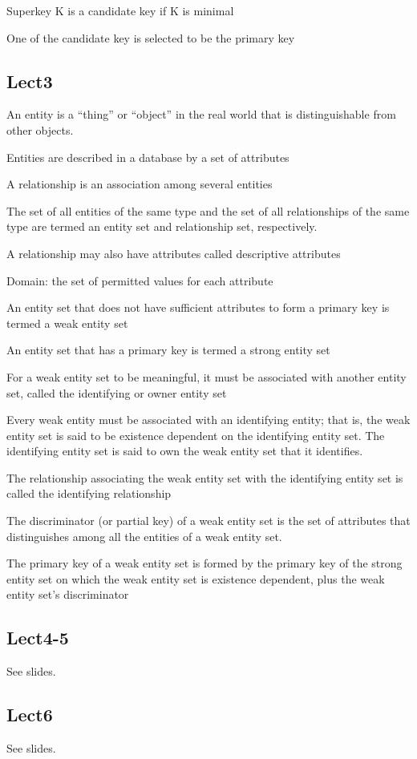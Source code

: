 \documentclass[8pt, a4paper, oneside, twocolumn]{extarticle}
\begin{document}
Superkey K is a candidate key if K is minimal

One of the candidate key is selected to be the primary key
\subsection{Lect3}
An entity is a “thing” or “object” in the real world that is 
distinguishable from other objects. 

Entities are described in a database by a set of attributes

A relationship is an association among several entities

The set of all entities of the same type and the set of all relationships of the same type are termed an entity set and relationship set, respectively. 

A relationship may also have attributes called descriptive attributes

Domain: the set of permitted values for each attribute 

An entity set that does not have sufficient attributes to form a primary key is termed a weak entity set

An entity set that has a primary key is termed a strong entity set

For a weak entity set to be meaningful, it must be associated with another entity set, called the identifying or owner entity set

Every weak entity must be associated with an identifying entity; that is, the weak entity set is said to be existence dependent on the  identifying entity set. The identifying entity set is said to  own the  weak entity set that it identifies. 

The relationship associating the weak entity set with the identifying  entity set is called the identifying relationship

The discriminator (or partial key) of a weak entity set is the set of attributes that distinguishes among all the entities of a weak entity set.

The primary key of a weak entity set is formed by the primary key of the strong entity set on which the weak entity set is existence dependent, plus the weak entity set’s discriminator
\subsection{Lect4-5}
See slides.
\subsection{Lect6}
See slides.
\end{document}
